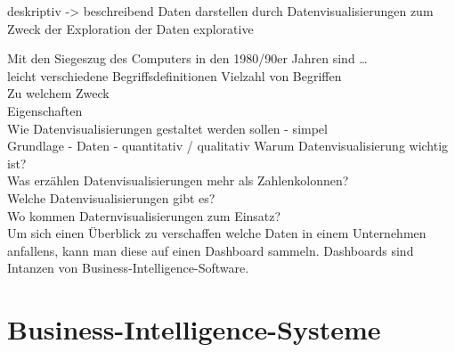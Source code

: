 deskriptiv -> beschreibend Daten darstellen durch Datenvisualisierungen zum Zweck der Exploration der Daten
explorative 

Mit den Siegeszug des Computers in den 1980/90er Jahren sind \dots\\
leicht verschiedene Begriffsdefinitionen
Vielzahl von Begriffen\\ 
Zu welchem Zweck\\
Eigenschaften\\
Wie Datenvisualisierungen gestaltet werden sollen - simpel\\
Grundlage - Daten - quantitativ / qualitativ
Warum Datenvisualisierung wichtig ist?\\
Was erzählen Datenvisualisierungen mehr als Zahlenkolonnen?\\
Welche Datenvisualisierungen gibt es?\\
Wo kommen Daternvisualisierungen zum Einsatz?\\

Um sich einen Überblick zu verschaffen welche Daten in einem Unternehmen anfallens, kann man diese auf einen Dashboard sammeln.
Dashboards sind Intanzen von Business-Intelligence-Software.





\clearpage
\section{Business-Intelligence-Systeme}


